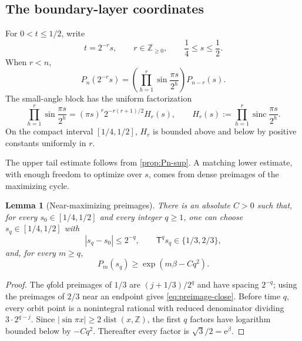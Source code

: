 \documentclass[11pt,oneside]{article}
\newtheorem{lemma}[theorem]{Lemma}
\theoremstyle{definition}
\theoremstyle{remark}
\newcommand{\Z}{\mathbb Z}
\newcommand{\e}{\mathrm e}
\newcommand{\sinc}{\operatorname{sinc}}
\newcommand{\T}{\mathsf T}
\begin{document}
\subsection{The boundary-layer coordinates}

For $0<t\le1/2$, write
\begin{equation}
 t=2^{-r}s,
 \qquad r\in\Z_{\ge0},
 \qquad \frac14\le s\le\frac12.
 \label{eq:transition-coordinates}
\end{equation}
When $r<n$,
\begin{equation}
 P_n(2^{-r}s)
 =\left(\prod_{h=1}^{r}\sin\frac{\pi s}{2^h}\right)P_{n-r}(s).
 \label{eq:P-transition}
\end{equation}
The small-angle block has the uniform factorization
\begin{equation}
 \prod_{h=1}^{r}\sin\frac{\pi s}{2^h}
 =(\pi s)^r2^{-r(r+1)/2}H_r(s),
 \qquad
 H_r(s):=\prod_{h=1}^{r}\sinc\frac{\pi s}{2^h}.
 \label{eq:small-block}
\end{equation}
On the compact interval $[1/4,1/2]$, $H_r$ is bounded above and below by
positive constants uniformly in $r$.

The upper tail estimate follows from \cref{prop:Pn-sup}.  A matching lower
estimate, with enough freedom to optimize over $s$, comes from dense preimages
of the maximizing cycle.

\begin{lemma}[Near-maximizing preimages]
\label{lem:preimages}
There is an absolute $C>0$ such that, for every $s_0\in[1/4,1/2]$ and every
integer $q\ge1$, one can choose $s_q\in[1/4,1/2]$ with
\begin{equation}
 |s_q-s_0|\le2^{-q},
 \qquad
 \T^qs_q\in\{1/3,2/3\},
 \label{eq:preimage-close}
\end{equation}
and, for every $m\ge q$,
\begin{equation}
 P_m(s_q)\ge\exp(m\beta-Cq^2).
 \label{eq:preimage-lower}
\end{equation}
\end{lemma}

\begin{proof}
The $q$fold preimages of $1/3$ are
$(j+1/3)/2^q$ and have spacing $2^{-q}$; using the preimages of $2/3$ near an
endpoint gives \eqref{eq:preimage-close}.  Before time $q$, every orbit point
is a nonintegral rational with reduced denominator dividing
$3\cdot2^{q-j}$.  Since
$|\sin\pi x|\ge2\operatorname{dist}(x,\Z)$, the first $q$ factors have
logarithm bounded below by $-Cq^2$.  Thereafter every factor is
$\sqrt3/2=\e^\beta$.
\end{proof}
\end{document}
